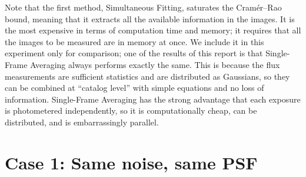 \documentclass[letter,11pt]{article}
\begin{document}
Note that the first method, Simultaneous Fitting, saturates the
Cram\'er--Rao bound, meaning that it extracts all the available
information in the images.  It is the most expensive in terms of
computation time and memory; it requires that all the images to be
measured are in memory at once.  We include it in this experiment only
for comparison; one of the results of this report is that Single-Frame
Averaging always performs exactly the same.  This is because the flux
measurements are sufficient statistics and are distributed as
Gaussians, so they can be combined at ``catalog level'' with simple
equations and no loss of information.  Single-Frame Averaging has the
strong advantage that each exposure is photometered independently, so
it is computationally cheap, can be distributed, and is embarrassingly
parallel.

\newpage

\section*{Case 1: Same noise, same PSF}
\end{document}
